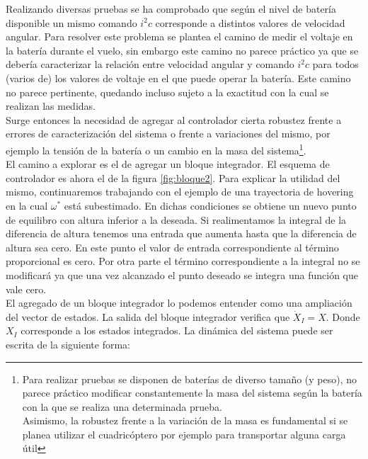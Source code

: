 \documentclass[main]{subfiles}
\begin{document}
Realizando diversas pruebas se ha comprobado que seg\'un el nivel de bater\'ia disponible un mismo comando $i^2c$ corresponde a distintos valores de velocidad angular. Para resolver este problema se plantea el camino de medir el voltaje en la bater\'ia durante el vuelo, sin embargo este camino no parece pr\'actico ya que se deber\'ia caracterizar la relaci\'on entre velocidad angular y comando $i^2c$ para todos (varios de) los valores de voltaje en el que puede operar la bater\'ia. Este camino no parece pertinente, quedando incluso sujeto a la exactitud con la cual se realizan las medidas.\\

Surge entonces la necesidad de agregar al controlador cierta robustez frente a errores de caracterizaci\'on del sistema o frente a variaciones del mismo, por ejemplo la tensi\'on de la bater\'ia o un cambio en la masa del sistema\footnote{Para realizar pruebas se disponen de bater\'ias de diverso tamaño (y peso), no parece pr\'actico modificar constantemente la masa del sistema seg\'un la bater\'ia con la que se realiza una determinada prueba. \\ 
Asimismo, la robustez frente a la variaci\'on de la masa es fundamental si se planea utilizar el cuadric\'optero por ejemplo para transportar alguna carga \'util}.\\

El camino a explorar es el de agregar un bloque integrador. El esquema de controlador es ahora el de la figura \ref{fig:bloque2}. Para explicar la utilidad del mismo, continuaremos trabajando con el ejemplo de una trayectoria de hovering en la cual $\omega^*$ est\'a subestimado. En dichas condiciones se obtiene un nuevo punto de equilibro con altura inferior a la deseada. Si realimentamos la integral de la diferencia de altura tenemos una entrada que aumenta hasta que la diferencia de altura sea cero. En este punto el valor de entrada correspondiente al t\'ermino proporcional es cero. Por otra parte el t\'ermino correspondiente a la integral no se modificar\'a ya que una vez alcanzado el punto deseado se integra una funci\'on que vale cero.\\

El agregado de un bloque integrador lo podemos entender como una ampliaci\'on del vector de estados. La salida del bloque integrador verifica que $\dot{X}_I = X$. Donde $X_I$ corresponde a los estados integrados. La din\'amica del sistema puede ser escrita de la siguiente forma:
\end{document}
